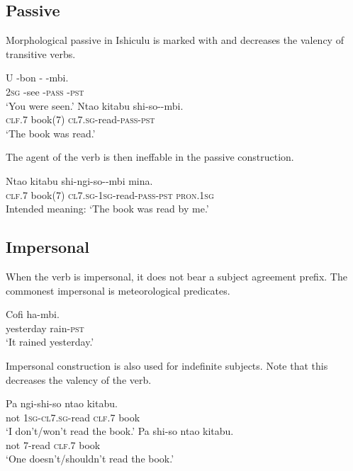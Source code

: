\subsection{Passive}

Morphological passive in Ishiculu is marked with \textit{} and decreases the valency of transitive verbs.

\begin{exe}
\ex
\gll U {-bon\textramshorns} -\textit{} -mbi. \\
\textsc{2sg} -see -\textsc{pass} -\textsc{pst}  \\
\trans `You were seen.'
\ex
\gll Nta\textbeltl o kitabu shi-so-\textit{}-mbi. \\
\textsc{clf}.7 book(7) \textsc{cl7.sg}-read-\textsc{pass}-\textsc{pst}  \\
\trans `The book was read.'
\end{exe}

The agent of the verb is then ineffable in the passive construction.

\begin{exe}
\ex
\gll * Nta\textbeltl o kitabu shi-ngi-so--mbi mina. \\
{} \textsc{clf}.7 book(7) \textsc{cl7.sg}-\textsc{1sg}-read-\textsc{pass}-\textsc{pst} \textsc{pron.1sg} \\
\trans Intended meaning: `The book was read by me.'
\end{exe}

\subsection{Impersonal}
When the verb is impersonal, it does not bear a subject agreement prefix. The commonest impersonal is meteorological predicates.

\begin{exe}
\ex
\gll Cofi ha-mbi. \\
yesterday rain-\textsc{pst} \\
\trans `It rained yesterday.'
\end{exe}

Impersonal construction is also used for indefinite subjects. Note that this decreases the valency of the verb.

\begin{exe}
\ex
\begin{xlist}
\ex
\gll Pa ngi-shi-so nta\textbeltl o kitabu. \\
not \textsc{1sg}-\textsc{cl7.sg}-read \textsc{clf}.7 book \\
\trans `I don't/won't read the book.'
\ex
\gll Pa shi-so nta\textbeltl o kitabu. \\
not \textsc{7}-read \textsc{clf}.7 book \\
\trans `One doesn't/shouldn't read the book.'
\end{xlist}
\end{exe}


